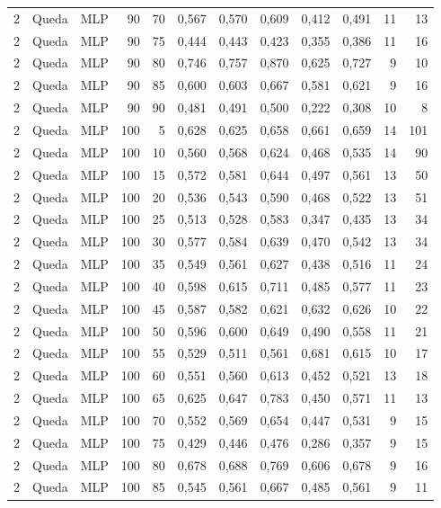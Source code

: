 \begin{longtable}{@{}rllrrrrrrrrr@{}}
2 & Queda & MLP & 90 & 70 & 0,567 & 0,570 & 0,609 & 0,412 & 0,491 & 11 & 13 \\
2 & Queda & MLP & 90 & 75 & 0,444 & 0,443 & 0,423 & 0,355 & 0,386 & 11 & 16 \\
2 & Queda & MLP & 90 & 80 & 0,746 & 0,757 & 0,870 & 0,625 & 0,727 & 9 & 10 \\
2 & Queda & MLP & 90 & 85 & 0,600 & 0,603 & 0,667 & 0,581 & 0,621 & 9 & 16 \\
2 & Queda & MLP & 90 & 90 & 0,481 & 0,491 & 0,500 & 0,222 & 0,308 & 10 & 8 \\
2 & Queda & MLP & 100 & 5 & 0,628 & 0,625 & 0,658 & 0,661 & 0,659 & 14 & 101 \\
2 & Queda & MLP & 100 & 10 & 0,560 & 0,568 & 0,624 & 0,468 & 0,535 & 14 & 90 \\
2 & Queda & MLP & 100 & 15 & 0,572 & 0,581 & 0,644 & 0,497 & 0,561 & 13 & 50 \\
2 & Queda & MLP & 100 & 20 & 0,536 & 0,543 & 0,590 & 0,468 & 0,522 & 13 & 51 \\
2 & Queda & MLP & 100 & 25 & 0,513 & 0,528 & 0,583 & 0,347 & 0,435 & 13 & 34 \\
2 & Queda & MLP & 100 & 30 & 0,577 & 0,584 & 0,639 & 0,470 & 0,542 & 13 & 34 \\
2 & Queda & MLP & 100 & 35 & 0,549 & 0,561 & 0,627 & 0,438 & 0,516 & 11 & 24 \\
2 & Queda & MLP & 100 & 40 & 0,598 & 0,615 & 0,711 & 0,485 & 0,577 & 11 & 23 \\
2 & Queda & MLP & 100 & 45 & 0,587 & 0,582 & 0,621 & 0,632 & 0,626 & 10 & 22 \\
2 & Queda & MLP & 100 & 50 & 0,596 & 0,600 & 0,649 & 0,490 & 0,558 & 11 & 21 \\
2 & Queda & MLP & 100 & 55 & 0,529 & 0,511 & 0,561 & 0,681 & 0,615 & 10 & 17 \\
2 & Queda & MLP & 100 & 60 & 0,551 & 0,560 & 0,613 & 0,452 & 0,521 & 13 & 18 \\
2 & Queda & MLP & 100 & 65 & 0,625 & 0,647 & 0,783 & 0,450 & 0,571 & 11 & 13 \\
2 & Queda & MLP & 100 & 70 & 0,552 & 0,569 & 0,654 & 0,447 & 0,531 & 9 & 15 \\
2 & Queda & MLP & 100 & 75 & 0,429 & 0,446 & 0,476 & 0,286 & 0,357 & 9 & 15 \\
2 & Queda & MLP & 100 & 80 & 0,678 & 0,688 & 0,769 & 0,606 & 0,678 & 9 & 16 \\
2 & Queda & MLP & 100 & 85 & 0,545 & 0,561 & 0,667 & 0,485 & 0,561 & 9 & 11 \\

\end{longtable}
